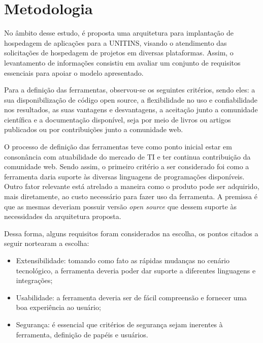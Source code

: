 



\chapter{Metodologia}\label{cap:metodologia}

No âmbito desse estudo, é proposta uma arquitetura para implantação de hospedagem de aplicações para a UNITINS, visando o atendimento das solicitações de hospedagem de projetos em diversas plataformas. Assim, o levantamento de informações consistiu em avaliar um conjunto de requisitos essenciais para apoiar o modelo apresentado.

Para a definição das ferramentas, observou-se os seguintes critérios, sendo eles:  a sua disponibilização de código open source, a flexibilidade no uso e confiabilidade nos resultados, as suas vantagens e desvantagens, a aceitação junto a comunidade científica e a documentação disponível, seja por meio de livros ou artigos publicados ou por contribuições junto a comunidade web.

O processo de definição das ferramentas teve como ponto inicial estar em consonância com atuabilidade do mercado de TI e ter continua contribuição da comunidade web. Sendo assim, o primeiro critério a ser considerado foi como a ferramenta daria suporte às diversas linguagens de programações disponíveis. Outro fator relevante está atrelado a maneira como o produto pode ser adquirido, mais diretamente, ao custo necessário para fazer uso da ferramenta. A premissa é que as mesmas deveriam possuir versão \textit{open source} que  dessem suporte às necessidades da arquitetura proposta.

Dessa forma, alguns requisitos foram considerados na escolha, os pontos citados a seguir nortearam a escolha: 
    \vspace*{0.5cm}

\begin{itemize}
	
	\item Extensibilidade: tomando como fato as rápidas mudanças no cenário tecnológico, a ferramenta deveria poder dar suporte a diferentes linguagens e integrações;
	\item Usabilidade: a ferramenta deveria ser de fácil compreensão e fornecer uma boa experiência ao usuário;
	\item Segurança: é essencial que critérios de segurança sejam inerentes à ferramenta, definição de papéis e usuários.
	
\end{itemize}

